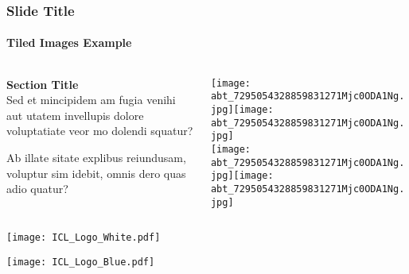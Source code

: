 \documentclass[
	aspectratio=169, %
	t, %
	onlytextwidth, %
	10pt, %
]{beamer}
\begin{document}

\begin{frame}
	\frametitle{Slide Title}
	\framesubtitle{Tiled Images Example}
	
	\small %
	
	\begin{columns}[T] %
		\begin{column}{0.3\linewidth} %
			\textbf{Section Title}\\
			Sed et mincipidem am fugia venihi aut utatem invellupis dolore voluptatiate veor mo dolendi squatur?

			Ab illate sitate explibus reiundusam, voluptur sim idebit, omnis dero quas adio quatur?
		\end{column}
		\begin{column}{0.68\linewidth} %
			\vspace{-3.5\baselineskip} %
			
			\texttt{[image: abt\_7295054328859831271Mjc0ODA1Ng.jpg]}\hfill\texttt{[image: abt\_7295054328859831271Mjc0ODA1Ng.jpg]}\\[4pt]
			\texttt{[image: abt\_7295054328859831271Mjc0ODA1Ng.jpg]}\hfill\texttt{[image: abt\_7295054328859831271Mjc0ODA1Ng.jpg]}\par
		\end{column}
	\end{columns}
\end{frame}


\begingroup
	
	\begin{frame}[plain] %
		\medskip %
		\centering %
		\texttt{[image: ICL\_Logo\_White.pdf]}
	\end{frame}
\endgroup


\begin{frame}[plain] %
	\medskip %
	\centering %
	\texttt{[image: ICL\_Logo\_Blue.pdf]}
\end{frame}
\end{document}
